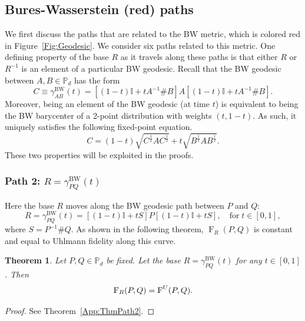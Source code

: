 \documentclass[12pt]{article}
\newtheorem{theorem}{Theorem}[section] %
\theoremstyle{definition}
\begin{document}
\subsection{Bures-Wasserstein (red) paths}
We first discuss the paths that are related to the BW metric, which is colored red in Figure~\ref{Fig:Geodesic}. We consider six paths related to this metric. One defining property of the base $R$ as it travels along these paths is that either $R$ or $R ^{-1} $ is an element of a particular BW geodesic. Recall that the BW geodesic between $A,B \in \mathbb P_d$ has the form
\begin{equation}
    C \equiv \gamma_{A B}^{\text{BW}} (t) = [(1-t)\mathbb I + t A ^{-1} \# B] A [(1-t)\mathbb I + t A ^{-1} \# B].
\end{equation}
Moreover, being an element of the BW geodesic (at time $t$) is equivalent to being the BW barycenter of a 2-point distribution with weights $(t, 1-t)$. As such, it uniquely satisfies the following fixed-point equation. 
\begin{equation}
    C = (1-t) \sqrt{C ^{\frac12} A C ^{\frac12} } + t \sqrt{B ^{\frac12} A B ^{\frac12} }.  
\end{equation}
These two properties will be exploited in the proofs. 

\subsubsection*{Path 2: $R = \gamma^{\mathrm{BW}}_{PQ}(t)$}

Here the base $R$ moves along the BW geodesic path between $P$ and $Q$:
\begin{equation}
R = \gamma^{\mathrm{BW}}_{PQ}(t) = \left[(1-t)\mathbb{I} + t S \right] P \left[(1-t)\mathbb{I} + t S \right], \quad \text{for} \; t \in [0,1],
\end{equation}
where $S = P^{-1} \# Q$. As shown in the following theorem, $\operatorname{F}_R(P,Q) $ is constant and equal to Uhlmann fidelity along this curve.

\begin{theorembox}
    \begin{theorem} \label{Thm:Path2}
        Let $P, Q \in \mathbb P_d$ be fixed. Let the base $R = \gamma^{\mathrm{BW}}_{PQ}(t)$ for any $t \in [0,1]$. Then
        \begin{equation}
            \operatorname{F}_R(P,Q) = \operatorname{F}^{\emph U}(P,Q). 
        \end{equation}
    \end{theorem}
\end{theorembox}
\begin{proof}
    See Theorem~\ref{App:ThmPath2}.
\end{proof}
\end{document}
